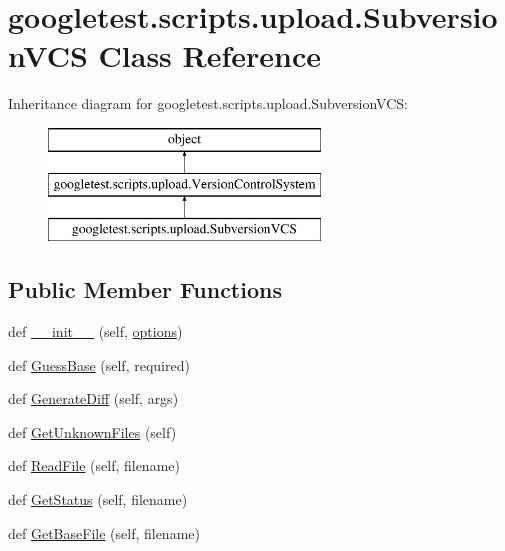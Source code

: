 \hypertarget{classgoogletest_1_1scripts_1_1upload_1_1_subversion_v_c_s}{}\section{googletest.\+scripts.\+upload.\+Subversion\+V\+CS Class Reference}
\label{classgoogletest_1_1scripts_1_1upload_1_1_subversion_v_c_s}
Inheritance diagram for googletest.\+scripts.\+upload.\+Subversion\+V\+CS\+:\begin{figure}[H]
\begin{center}
\leavevmode
\includegraphics[height=3.000000cm]{da/db9/classgoogletest_1_1scripts_1_1upload_1_1_subversion_v_c_s}
\end{center}
\end{figure}
\subsection*{Public Member Functions}
\begin{DoxyCompactItemize}
\item 
def \mbox{\hyperlink{classgoogletest_1_1scripts_1_1upload_1_1_subversion_v_c_s_a1ddd99fb8914f899805a816c8daae63c}{\+\_\+\+\_\+init\+\_\+\+\_\+}} (self, \mbox{\hyperlink{classgoogletest_1_1scripts_1_1upload_1_1_version_control_system_abd30c66b6c5c39c14df9a1fa4ffac67b}{options}})
\item 
def \mbox{\hyperlink{classgoogletest_1_1scripts_1_1upload_1_1_subversion_v_c_s_a6f90129a574e7f74c77dfc24d9693203}{Guess\+Base}} (self, required)
\item 
def \mbox{\hyperlink{classgoogletest_1_1scripts_1_1upload_1_1_subversion_v_c_s_aec042415e243ba61d29c70540dcc8d87}{Generate\+Diff}} (self, args)
\item 
def \mbox{\hyperlink{classgoogletest_1_1scripts_1_1upload_1_1_subversion_v_c_s_ac112319b31bf62e78d21c4416f5dad25}{Get\+Unknown\+Files}} (self)
\item 
def \mbox{\hyperlink{classgoogletest_1_1scripts_1_1upload_1_1_subversion_v_c_s_ada3f1518757ec50d4736a45e7b8a9f8d}{Read\+File}} (self, filename)
\item 
def \mbox{\hyperlink{classgoogletest_1_1scripts_1_1upload_1_1_subversion_v_c_s_ae11892c2437282c5a7a2f8a61d575b9e}{Get\+Status}} (self, filename)
\item 
def \mbox{\hyperlink{classgoogletest_1_1scripts_1_1upload_1_1_subversion_v_c_s_a1a49556f2fec864cb13543a2330a32a3}{Get\+Base\+File}} (self, filename)
\end{DoxyCompactItemize}
